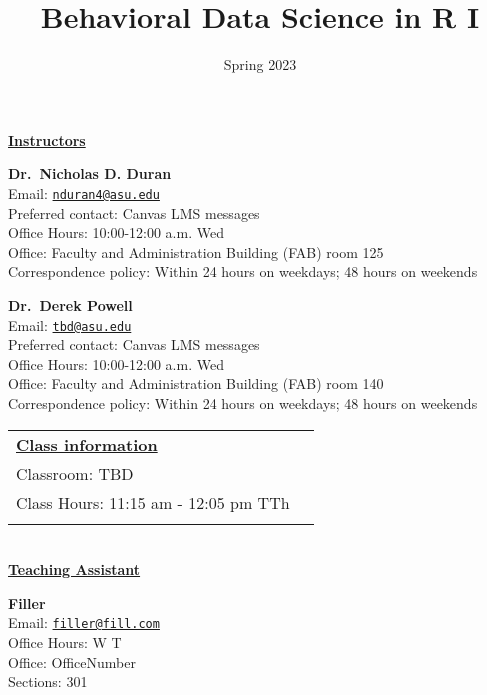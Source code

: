 \documentclass[11pt,]{article}
\title{Behavioral Data Science in R I}
\date{Spring 2023}
\begin{document}
  

		\maketitle
		
	
		\thispagestyle{firststyle}

\textbf{\underline{Instructors}}
\setlength{\columnsep}{30pt}
\begin{multicols}{2}

  \textbf{Dr.~Nicholas D. Duran}\\
  Email: \href{mailto:nduran4@asu.edu}{\nolinkurl{nduran4@asu.edu}}\\
  Preferred contact: Canvas LMS messages\\
  Office Hours: 10:00-12:00 a.m. Wed\\
  Office: Faculty and Administration Building (FAB) room 125\\
  Correspondence policy: Within 24 hours on weekdays; 48 hours on
weekends\\
    \columnbreak
    

  \textbf{Dr.~Derek Powell}\\
  Email: \href{mailto:tbd@asu.edu}{\nolinkurl{tbd@asu.edu}}\\
  Preferred contact: Canvas LMS messages\\
  Office Hours: 10:00-12:00 a.m. Wed\\
  Office: Faculty and Administration Building (FAB) room 140\\
  Correspondence policy: Within 24 hours on weekdays; 48 hours on
weekends\\
    \columnbreak
    
  \end{multicols}
  

\noindent \begin{tabular*}{\textwidth}{ @{\extracolsep{\fill}} lr @{\extracolsep{\fill}}}
\textbf{\underline{Class information}}\\
  Classroom: TBD\\
  Class Hours: 11:15 am - 12:05 pm TTh\\
    \\
	\end{tabular*}\\

\noindent\textbf{\underline{Teaching Assistant}}
  \begin{multicols}{2}
  \noindent\textbf{Filler}\\
  Email: \href{mailto:filler@fill.com}{\nolinkurl{filler@fill.com}}\\
  Office Hours: W T\\
  Office: OfficeNumber\\
  Sections: 301\\
    \columnbreak
  \end{multicols}
\end{document}
